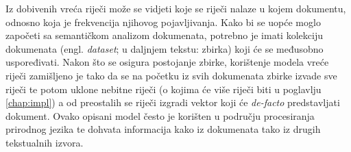 \documentclass[times, utf8, zavrsni, numeric]{fer}
\begin{document}
Iz dobivenih vreća riječi može se vidjeti koje se riječi nalaze u kojem dokumentu, odnosno koja je frekvencija njihovog pojavljivanja. \newline
Kako bi se uopće moglo započeti sa semantičkom analizom dokumenata, potrebno je imati kolekciju dokumenata (engl. \textit{dataset}; u daljnjem tekstu: zbirka) koji će se međusobno uspoređivati. Nakon što se osigura postojanje zbirke, korištenje modela vreće riječi zamišljeno je tako da se na početku iz svih dokumenata zbirke izvade sve riječi te potom uklone nebitne riječi (o kojima će više riječi biti u poglavlju \ref{chap:impl}) a od preostalih se riječi izgradi vektor koji će \textit{de-facto} predstavljati dokument. Ovako opisani model često je korišten u području procesiranja prirodnog jezika te dohvata informacija kako iz dokumenata tako iz drugih tekstualnih izvora.
\end{document}
